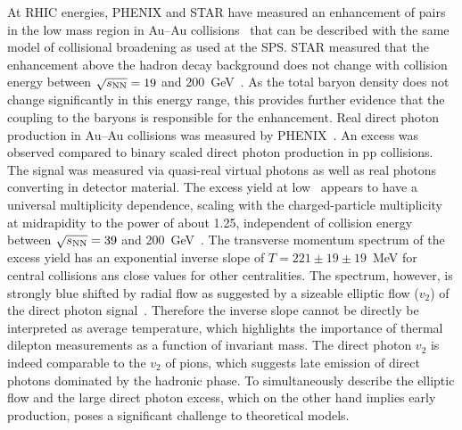 \documentclass[../report.tex]{subfiles}
\begin{document}
At RHIC energies, PHENIX and STAR have measured an enhancement of \Pepem pairs in the low mass region in Au--Au collisions~\cite{Adare:2009qk,Adare:2015ila,Adamczyk:2013caa,Adamczyk:2015mmx} that can be described with the same model of collisional broadening as used at the SPS. STAR measured that the enhancement above the hadron decay background does not change with collision energy between $\sqrt{s_{\rm NN}}=19$ and 200~GeV~\cite{Adamczyk:2015mmx}. As the total baryon density does not change significantly in this energy range, this provides further evidence that the \Prho coupling to the baryons is responsible for the enhancement. 
Real direct photon production in Au--Au collisions was measured by PHENIX~\cite{Adare:2008ab,Adare:2014fwh,Adare:2018wgc}. An excess was observed compared to binary scaled direct photon production in pp collisions. The signal was measured via quasi-real virtual photons as well as real photons converting in detector material. The excess yield at low \pT~appears to have a universal multiplicity dependence, scaling with the charged-particle multiplicity at midrapidity to the power of about 1.25, independent of collision energy between $\sqrt{s_{\rm NN}} = 39$ and 200~GeV~\cite{Adare:2018wgc}. The transverse momentum spectrum of the excess yield has an exponential inverse slope of $T=221\pm19\pm19$~MeV for central collisions ans close values for other centralities. The spectrum, however, is strongly blue shifted by radial flow as suggested by a sizeable elliptic flow ($v_2$) of the direct photon signal~\cite{Adare:2011zr}. Therefore the inverse slope cannot be directly be interpreted as average temperature, which highlights the importance of thermal dilepton measurements as a function of invariant mass. The direct photon $v_2$ is indeed comparable to the $v_2$ of pions, which suggests late emission of direct photons dominated by the hadronic phase. To simultaneously describe the elliptic flow and the large direct photon excess, which on the other hand implies early production, poses a significant challenge to theoretical models.
\end{document}

